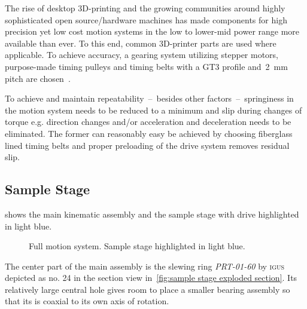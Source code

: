         The rise of desktop 3D-printing and the growing communities around highly sophisticated open source/hardware machines has made components for high precision yet low cost motion systems in the low to lower-mid power range more available than ever.
        To this end, common 3D-printer parts are used where applicable.
        To achieve accuracy, a gearing system utilizing stepper motors, purpose-made timing pulleys and timing belts with a GT3 profile and~\qty{2}{\milli\metre} pitch are chosen~\cite{Manual.POWERGRIPGT3,Manual.LIGHTPOWERPRECISION}.
        
        To achieve and maintain repeatability~--~besides other factors~--~springiness in the motion system needs to be reduced to a minimum and slip during changes of torque e.g. direction changes and/or acceleration and deceleration needs to be eliminated.
        The former can reasonably easy be achieved by choosing fiberglass lined timing belts and proper preloading of the drive system removes residual slip.\par\medskip

        
        \subsection{Sample Stage}\label{sec:sample stage}
             shows the main kinematic assembly and the sample stage with drive highlighted in light blue.
            \begin{figure}[!ht]
                \centering
                \caption[Full motion system. Sample stage highlighted in light blue]{Full motion system. Sample stage highlighted in light blue.}%
                \label{fig:xmagix full sample highlightes}%
            \end{figure}%

            The center part of the main assembly is the slewing ring \textit{PRT-01-60} by \textsc{igus}~\cite{Manual.IglidePRTPolymerSlewingRings.} depicted as no. 24 in the section view in~\cref{fig:sample stage exploded section}.
            Its relatively large central hole gives room to place a smaller bearing assembly so that its is coaxial to its own axis of rotation.\par\medskip

